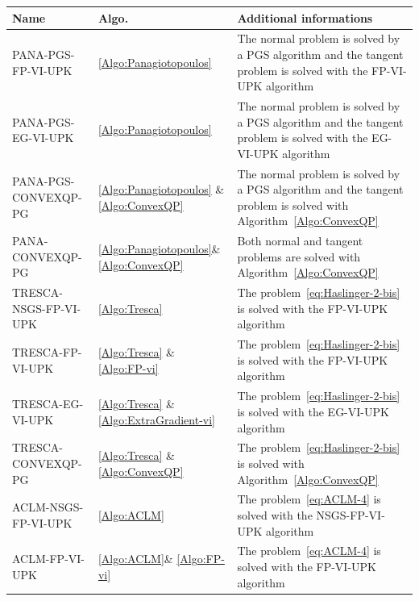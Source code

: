 \begin{table}
  \centering
  \begin{tabular}{|l|l|p{}|}
    \hline
    {Name}
    & Algo.
    & Additional informations
    \\
    \hline
    \sf PANA-PGS-FP-VI-UPK
    & \ref{Algo:Panagiotopoulos}
    &  The normal problem is solved by a PGS algorithm and the tangent problem is solved with the {\sf FP-VI-UPK} algorithm
    \\
    \hline
    \sf PANA-PGS-EG-VI-UPK
    & \ref{Algo:Panagiotopoulos}
    &  The normal problem is solved by a PGS algorithm and the tangent problem is solved with the  {\sf EG-VI-UPK} algorithm
    \\
    \hline
    \sf PANA-PGS-CONVEXQP-PG
    & \ref{Algo:Panagiotopoulos} \&\ref{Algo:ConvexQP}
    &  The normal problem is solved by a PGS algorithm and the tangent problem is solved with Algorithm~\ref{Algo:ConvexQP}
    \\
    \hline
    \sf PANA-CONVEXQP-PG
    & \ref{Algo:Panagiotopoulos}\&\ref{Algo:ConvexQP}
    &  Both normal and tangent problems are solved  with Algorithm~\ref{Algo:ConvexQP}
    \\
    \hline
    \hline
    \sf TRESCA-NSGS-FP-VI-UPK
    & \ref{Algo:Tresca}
    & The problem~\ref{eq:Haslinger-2-bis} is solved with the {\sf FP-VI-UPK} algorithm
    \\
    \hline
    \sf TRESCA-FP-VI-UPK
    & \ref{Algo:Tresca} \& \ref{Algo:FP-vi}
    & The problem~\ref{eq:Haslinger-2-bis} is solved with the {\sf FP-VI-UPK} algorithm
    \\
    \hline
    \sf TRESCA-EG-VI-UPK
    & \ref{Algo:Tresca} \& \ref{Algo:ExtraGradient-vi}
    & The problem~\ref{eq:Haslinger-2-bis} is solved with the {\sf EG-VI-UPK} algorithm
    \\
    \hline
    \sf TRESCA-CONVEXQP-PG
    & \ref{Algo:Tresca} \&\ref{Algo:ConvexQP}
    & The problem~\ref{eq:Haslinger-2-bis} is solved with Algorithm~\ref{Algo:ConvexQP}
    \\
    \hline
    \hline
    \sf ACLM-NSGS-FP-VI-UPK
    &   \ref{Algo:ACLM}
    &  The problem~\ref{eq:ACLM-4} is solved with the {\sf NSGS-FP-VI-UPK} algorithm
    \\
    \hline
    \sf ACLM-FP-VI-UPK
    & \ref{Algo:ACLM}\& \ref{Algo:FP-vi}
    & The problem~\ref{eq:ACLM-4} is solved with the {\sf FP-VI-UPK} algorithm

\end{tabular}
\end{table}
